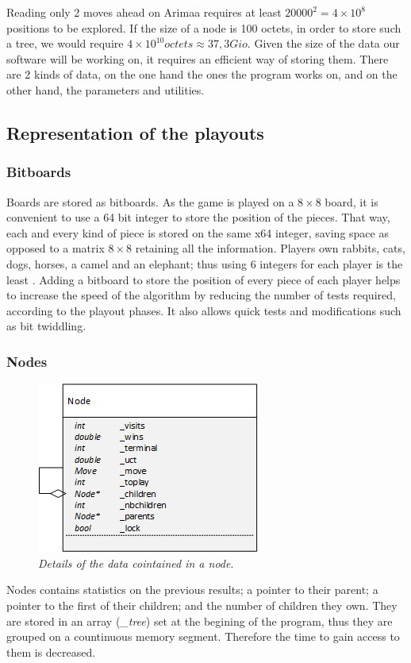 Reading only 2 moves ahead on Arimaa requires at least \ensuremath{20 000^2 = 4 \times 10^8} positions to be explored. If the size of a node is 100 octets, in order to store such a tree, we would require \ensuremath{4\times10^{10} octets \approx 37,3 Gio}. Given the size of the data our software will be working on, it requires an efficient way of storing them. There are 2 kinds of data, on the one hand the ones the program works on, and on the other hand, the parameters and utilities.
\subsection{Representation of the playouts}
\subsubsection{Bitboards}
Boards are stored as bitboards. As the game is played on a \ensuremath{8\times8} board, it is convenient to use a 64 bit integer to store the position of the pieces. That way, each and every kind of piece is stored on the same x64 integer, saving space as opposed to a matrix \ensuremath{8\times8} retaining all the information. Players own rabbits, cats, dogs, horses, a camel and an elephant; thus using 6 integers for each player is the least . Adding a bitboard to store the position of every piece of each player helps to increase the speed of the algorithm by reducing the number of tests required, according to the playout phases. It also allows quick tests and modifications such as bit twiddling.%

\subsubsection{Nodes}
\begin{figure}[H] 
\centerline{\includegraphics[scale=0.8]{Data_Structure/Img/Node.png}}
\caption{\label{fig:nodedetails}\textit{Details of the data cointained in a node}.}
\end{figure}
Nodes contains statistics on the previous results; a pointer to their parent; a pointer to the first of their children; and the number of children they own. They are stored in an array (\textit{\_tree}) set at the begining of the program, thus they are grouped on a countinuous memory segment. Therefore the time to gain access to them is decreased.

